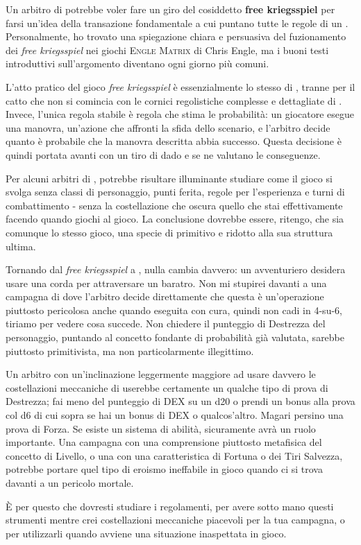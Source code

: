 
Un arbitro di \dnd{} potrebbe voler fare un giro del cosiddetto \textbf{free kriegsspiel} per farsi un'idea della transazione fondamentale a cui puntano tutte le regole di un . Personalmente, ho trovato una spiegazione chiara e persuasiva del fuzionamento dei \textit{free kriegsspiel} nei giochi \textsc{Engle Matrix} di Chris Engle, ma i buoni testi introduttivi sull'argomento diventano ogni giorno più comuni.

L'atto pratico del gioco \textit{free kriegsspiel} è essenzialmente lo stesso di \dnd{}, tranne per il catto che non si comincia con le cornici regolistiche complesse e dettagliate di \dnd{}. Invece, l'unica regola stabile è regola che stima le probabilità: un giocatore esegue una manovra, un'azione che affronti la sfida dello scenario, e l'arbitro decide quanto è probabile che la manovra descritta abbia successo. Questa decisione è quindi portata avanti con un tiro di dado e se ne valutano le conseguenze.

Per alcuni arbitri di \dnd{}, potrebbe risultare illuminante studiare come il gioco si svolga senza classi di personaggio, punti ferita, regole per l'esperienza e turni di combattimento - senza la costellazione che oscura quello che stai effettivamente facendo quando giochi al gioco. La conclusione dovrebbe essere, ritengo, che sia comunque lo stesso gioco, una specie di \dnd{} primitivo e ridotto alla sua struttura ultima.

Tornando dal \textit{free kriegsspiel} a \dnd{}, nulla cambia davvero: un avventuriero desidera usare una corda per attraversare un baratro. Non mi stupirei davanti a una campagna di \dnd{} dove l'arbitro decide direttamente che questa è un'operazione piuttosto pericolosa anche quando eseguita con cura, quindi non cadi in 4-su-6, tiriamo per vedere cosa succede. Non chiedere il punteggio di Destrezza del personaggio, puntando al concetto fondante di probabilità già valutata, sarebbe piuttosto primitivista, ma non particolarmente illegittimo.

Un arbitro con un'inclinazione leggermente maggiore ad usare davvero le costellazioni meccaniche di \dnd{} userebbe certamente un qualche tipo di prova di Destrezza; fai meno del punteggio di DEX su un d20 o prendi un bonus alla prova col d6 di cui sopra se hai un bonus di DEX o qualcos'altro. Magari persino una prova di Forza. Se esiste un sistema di abilità, sicuramente avrà un ruolo importante. Una campagna con una comprensione piuttosto metafisica del concetto di Livello, o una con una caratteristica di Fortuna o dei Tiri Salvezza, potrebbe portare quel tipo di eroismo ineffabile in gioco quando ci si trova davanti a un pericolo mortale.

È per questo che dovresti studiare i regolamenti, per avere sotto mano questi strumenti mentre crei costellazioni meccaniche piacevoli per la tua campagna, o per utilizzarli quando avviene una situazione inaspettata in gioco.